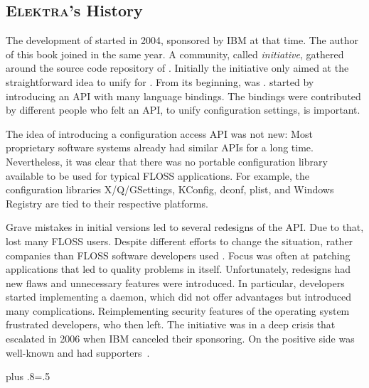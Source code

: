 \subsection{\textsc{Elektra}'s History}

The development of  started in 2004, sponsored by IBM at that time.
The author of this book joined in the same year.
A community, called \emph{\elektra{} initiative}, gathered around the source code repository of .
Initially the initiative only aimed at the straightforward idea to unify  for .
From its beginning, \elektra{} was .
 started by introducing an API with many language bindings.
The bindings were contributed by different people who felt an API, to unify configuration settings, is important.

The idea of introducing a configuration access API was not new:
Most proprietary software systems already had similar APIs for a long time.
Nevertheless, it was clear that there was no portable configuration library available to be used for typical FLOSS applications.
For example, the configuration libraries X/Q/GSettings, KConfig, dconf, plist, and Windows Registry are tied to their respective platforms.

Grave mistakes in initial versions led to several redesigns of the API.
Due to that, \elektra{} lost many FLOSS users.
Despite different efforts to change the situation, rather companies than FLOSS software developers used \elektra{}.
Focus was often at patching applications that led to quality problems in  itself.
Unfortunately, redesigns had new flaws and unnecessary features were introduced.
In particular, developers started implementing a daemon, which did not offer advantages but introduced many complications.
Reimplementing security features of the operating system frustrated developers, who then left.
The \elektra{} initiative was in a deep crisis that escalated in 2006 when IBM canceled their sponsoring.
On the positive side \elektra{} was well-known and had supporters~\cite{raab2017challenges}.%
{\parfillskip=0pt plus .8\textwidth \emergencystretch=.5\textwidth \par}

